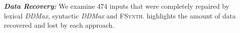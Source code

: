 \documentclass[sigconf,review,anonymous]{acmart}
\newcounter{todocounter}
\newcommand{\todo}[1]{\marginpar{$|$}\textcolor{red}{\stepcounter{todocounter}\footnote[\thetodocounter]{\textcolor{red}{\textbf{TODO }}\textit{#1}}}}
\newcommand{\recheck}[1]{\textcolor{red}{#1}}
\renewcommand{\todo}[1]{}
\newcommand{\approach}{\textsc{FSynth}\xspace}
\newcommand{\ddmax}{\textit{DDMax}\xspace}
\begin{document}

\noindent
\textbf{\textit{Data Recovery:}} 
We examine 474 inputs that were completely repaired by %
lexical \ddmax, syntactic \ddmax and \approach.  %
highlights the amount of data %
recovered and lost %
by each approach. %
\end{document}
